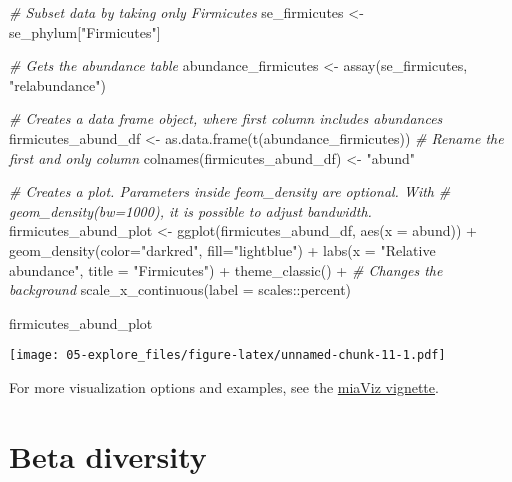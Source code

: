 \documentclass[
  oneside]{book}
\newenvironment{Shaded}{\begin{snugshade}}{\end{snugshade}}
\newcommand{\AttributeTok}[1]{\textcolor[rgb]{0.77,0.63,0.00}{#1}}
\newcommand{\CommentTok}[1]{\textcolor[rgb]{0.56,0.35,0.01}{\textit{#1}}}
\newcommand{\FunctionTok}[1]{\textcolor[rgb]{0.00,0.00,0.00}{#1}}
\newcommand{\NormalTok}[1]{#1}
\newcommand{\OtherTok}[1]{\textcolor[rgb]{0.56,0.35,0.01}{#1}}
\newcommand{\SpecialCharTok}[1]{\textcolor[rgb]{0.00,0.00,0.00}{#1}}
\newcommand{\StringTok}[1]{\textcolor[rgb]{0.31,0.60,0.02}{#1}}
\begin{document}
\begin{Shaded}
\begin{Highlighting}[]
\CommentTok{\# Subset data by taking only Firmicutes}
\NormalTok{se\_firmicutes }\OtherTok{\textless{}{-}}\NormalTok{ se\_phylum[}\StringTok{"Firmicutes"}\NormalTok{]}

\CommentTok{\# Gets the abundance table}
\NormalTok{abundance\_firmicutes }\OtherTok{\textless{}{-}} \FunctionTok{assay}\NormalTok{(se\_firmicutes, }\StringTok{"relabundance"}\NormalTok{)}

\CommentTok{\# Creates a data frame object, where first column includes abundances}
\NormalTok{firmicutes\_abund\_df }\OtherTok{\textless{}{-}} \FunctionTok{as.data.frame}\NormalTok{(}\FunctionTok{t}\NormalTok{(abundance\_firmicutes))}
\CommentTok{\# Rename the first and only column}
\FunctionTok{colnames}\NormalTok{(firmicutes\_abund\_df) }\OtherTok{\textless{}{-}} \StringTok{"abund"}

\CommentTok{\# Creates a plot. Parameters inside feom\_density are optional. With }
\CommentTok{\# geom\_density(bw=1000), it is possible to adjust bandwidth.}
\NormalTok{firmicutes\_abund\_plot }\OtherTok{\textless{}{-}} \FunctionTok{ggplot}\NormalTok{(firmicutes\_abund\_df, }\FunctionTok{aes}\NormalTok{(}\AttributeTok{x =}\NormalTok{ abund)) }\SpecialCharTok{+} 
  \FunctionTok{geom\_density}\NormalTok{(}\AttributeTok{color=}\StringTok{"darkred"}\NormalTok{, }\AttributeTok{fill=}\StringTok{"lightblue"}\NormalTok{) }\SpecialCharTok{+} 
  \FunctionTok{labs}\NormalTok{(}\AttributeTok{x =} \StringTok{"Relative abundance"}\NormalTok{, }\AttributeTok{title =} \StringTok{"Firmicutes"}\NormalTok{) }\SpecialCharTok{+}
  \FunctionTok{theme\_classic}\NormalTok{() }\SpecialCharTok{+} \CommentTok{\# Changes the background}
  \FunctionTok{scale\_x\_continuous}\NormalTok{(}\AttributeTok{label =}\NormalTok{ scales}\SpecialCharTok{::}\NormalTok{percent)}

\NormalTok{firmicutes\_abund\_plot}
\end{Highlighting}
\end{Shaded}

\texttt{[image: 05-explore\_files/figure-latex/unnamed-chunk-11-1.pdf]}

For more visualization options and examples, see the \href{https://microbiome.github.io/miaViz/articles/miaViz.html}{miaViz vignette}.

\hypertarget{beta-diversity}{%
\chapter{Beta diversity}\label{beta-diversity}}
\end{document}
